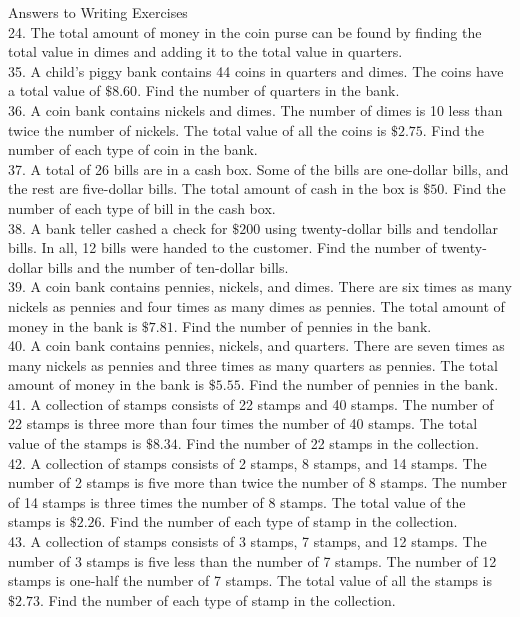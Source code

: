 \documentclass{ximera}
\begin{document}
Answers to Writing Exercises\\
24. The total amount of money in the coin purse can be found by finding the total value in dimes and adding it to the total value in quarters.\\
35. A child's piggy bank contains 44 coins in quarters and dimes. The coins have a total value of $\$ 8.60$. Find the number of quarters in the bank.\\
36. A coin bank contains nickels and dimes. The number of dimes is 10 less than twice the number of nickels. The total value of all the coins is $\$ 2.75$. Find the number of each type of coin in the bank.\\
37. A total of 26 bills are in a cash box. Some of the bills are one-dollar bills, and the rest are five-dollar bills. The total amount of cash in the box is $\$ 50$. Find the number of each type of bill in the cash box.\\
38. A bank teller cashed a check for $\$ 200$ using twenty-dollar bills and tendollar bills. In all, 12 bills were handed to the customer. Find the number of twenty-dollar bills and the number of ten-dollar bills.\\
39. A coin bank contains pennies, nickels, and dimes. There are six times as many nickels as pennies and four times as many dimes as pennies. The total amount of money in the bank is $\$ 7.81$. Find the number of pennies in the bank.\\
40. A coin bank contains pennies, nickels, and quarters. There are seven times as many nickels as pennies and three times as many quarters as pennies. The total amount of money in the bank is $\$ 5.55$. Find the number of pennies in the bank.\\
41. A collection of stamps consists of 22\textcent{} stamps and 40\textcent{} stamps. The number of 22\textcent{} stamps is three more than four times the number of 40\textcent{} stamps. The total value of the stamps is $\$ 8.34$. Find the number of 22\textcent{} stamps in the collection.\\
42. A collection of stamps consists of 2\textcent{} stamps, 8\textcent{} stamps, and 14\textcent{} stamps. The number of 2\textcent{} stamps is five more than twice the number of 8\textcent{} stamps. The number of 14\textcent{} stamps is three times the number of 8\textcent{} stamps. The total value of the stamps is $\$ 2.26$. Find the number of each type of stamp in the collection.\\
43. A collection of stamps consists of 3\textcent{} stamps, 7\textcent{} stamps, and 12\textcent{} stamps. The number of 3\textcent{} stamps is five less than the number of 7\textcent{} stamps. The number of 12\textcent{} stamps is one-half the number of 7\textcent{} stamps. The total value of all the stamps is $\$ 2.73$. Find the number of each type of stamp in the collection.\\
\end{document}
